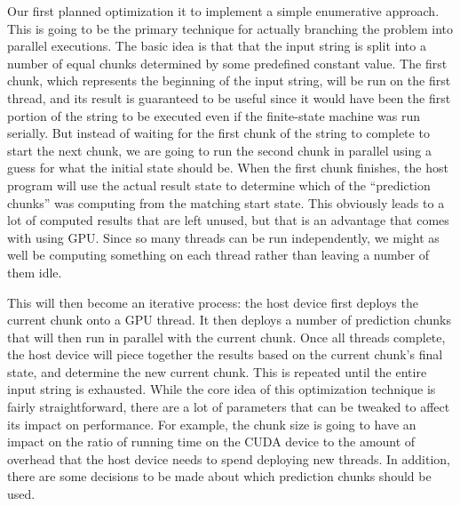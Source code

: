 \documentclass[11pt]{sigplanconf}
\begin{document}
Our first planned optimization it to implement a simple enumerative approach. This is going to be the primary technique for actually branching the problem into parallel executions. The basic idea is that that the input string is split into a number of equal chunks determined by some predefined constant value. The first chunk, which represents the beginning of the input string, will be run on the first thread, and its result is guaranteed to be useful since it would have been the first portion of the string to be executed even if the finite-state machine was run serially. But instead of waiting for the first chunk of the string to complete to start the next chunk, we are going to run the second chunk in parallel using a guess for what the initial state should be. When the first chunk finishes, the host program will use the actual result state to determine which of the ``prediction chunks'' was computing from the matching start state. This obviously leads to a lot of computed results that are left unused, but that is an advantage that comes with using GPU. Since so many threads can be run independently, we might as well be computing something on each thread rather than leaving a number of them idle. 

This will then become an iterative process: the host device first deploys the current chunk onto a GPU thread. It then deploys a number of prediction chunks that will then run in parallel with the current chunk. Once all threads complete, the host device will piece together the results based on the current chunk's final state, and determine the new current chunk. This is repeated until the entire input string is exhausted. While the core idea of this optimization technique is fairly straightforward, there are a lot of parameters that can be tweaked to affect its impact on performance. For example, the chunk size is going to have an impact on the ratio of running time on the CUDA device to the amount of overhead that the host device needs to spend deploying new threads. In addition, there are some decisions to be made about which prediction chunks should be used. 
\end{document}
